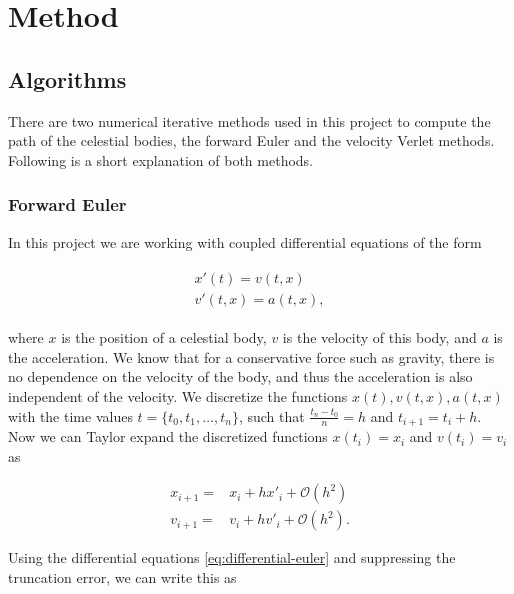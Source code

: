 \documentclass[../main.tex]{subfiles}
\begin{document}
\section{Method}\label{sec:method}
\iffalse
\subsection{Units}
The astronomical unit (AU)
\fi

\subsection{Algorithms}
There are two numerical iterative methods used in this project to compute the path of the celestial bodies, the forward Euler and the velocity Verlet methods. Following is a short explanation of both methods.

\subsubsection{Forward Euler}
\label{sec:euler}

In this project we are working with coupled differential equations of the form

\begin{align}
    \begin{split}
        x'(t) = v(t,x)\\
        v'(t,x) = a(t,x),
    \end{split}
    \label{eq:differential-euler}
\end{align}

where $x$ is the position of a celestial body, $v$ is the velocity of this body, and $a$ is the acceleration. We know that for a conservative force such as gravity, there is no dependence on the velocity of the body, and thus the acceleration is also independent of the velocity. We discretize the functions $x(t), v(t,x), a(t,x)$ with the time values $t = \{t_0, t_1, \ldots , t_n\}$, such that $\frac{t_n - t_0}{n} = h$ and $t_{i+1} = t_i + h$. Now we can Taylor expand the discretized functions $x(t_i) = x_i$ and $v(t_i) = v_i$ as

\begin{align*}
    x_{i+1} = & x_i + h x'_i + \mathcal{O}(h^2) \\
    v_{i+1} = & v_i + h v'_i + \mathcal{O}(h^2).
\end{align*}

Using the differential equations \cref{eq:differential-euler} and suppressing the truncation error, we can write this as
\end{document}
